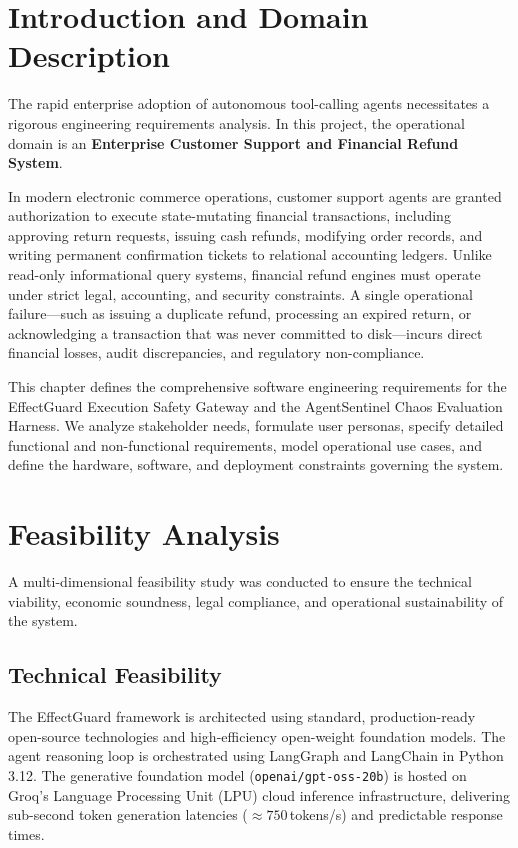 
\section{Introduction and Domain Description}

The rapid enterprise adoption of autonomous tool-calling agents necessitates a rigorous engineering requirements analysis. In this project, the operational domain is an \textbf{Enterprise Customer Support and Financial Refund System}. 

In modern electronic commerce operations, customer support agents are granted authorization to execute state-mutating financial transactions, including approving return requests, issuing cash refunds, modifying order records, and writing permanent confirmation tickets to relational accounting ledgers. Unlike read-only informational query systems, financial refund engines must operate under strict legal, accounting, and security constraints. A single operational failure---such as issuing a duplicate refund, processing an expired return, or acknowledging a transaction that was never committed to disk---incurs direct financial losses, audit discrepancies, and regulatory non-compliance.

This chapter defines the comprehensive software engineering requirements for the EffectGuard Execution Safety Gateway and the AgentSentinel Chaos Evaluation Harness. We analyze stakeholder needs, formulate user personas, specify detailed functional and non-functional requirements, model operational use cases, and define the hardware, software, and deployment constraints governing the system.

\section{Feasibility Analysis}

A multi-dimensional feasibility study was conducted to ensure the technical viability, economic soundness, legal compliance, and operational sustainability of the system.

\subsection{Technical Feasibility}
The EffectGuard framework is architected using standard, production-ready open-source technologies and high-efficiency open-weight foundation models. The agent reasoning loop is orchestrated using LangGraph and LangChain in Python 3.12. The generative foundation model (\texttt{openai/gpt-oss-20b}) is hosted on Groq's Language Processing Unit (LPU) cloud inference infrastructure, delivering sub-second token generation latencies ($\approx 750$\,tokens/s) and predictable response times. 

